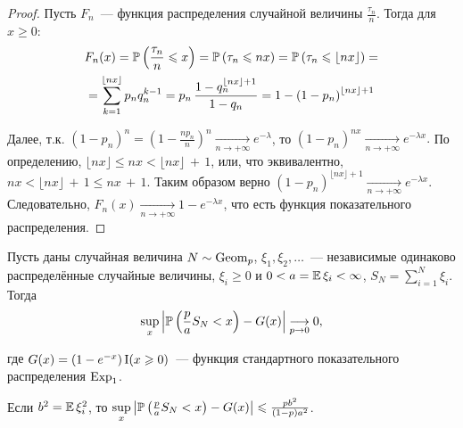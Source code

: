 \begin{proof}
    Пусть $F_n$~--- функция распределения случайной величины $\frac{\tau_n}{n}$.
    Тогда для $x \geqslant 0$:
    \begin{multline*}        
        F_{n}(x)=\operatorname{\mathbb{P}}\left(\frac{\tau_{n}}{n} \leqslant x\right)=
        \operatorname{\mathbb{P}}\left(\tau_{n} \leqslant n x\right) = 
        \operatorname{\mathbb{P}}\left(\tau_{n} \leqslant \lfloor n x\rfloor\right) = \\
        = \sum\limits_{k = 1}^{\lfloor nx \rfloor} p_n q_n^{k-1} = 
        p_n \, \frac{1 - q_n^{\lfloor nx \rfloor + 1}} {1-q_n} = 
        1-\left(1-p_{n}\right)^{\lfloor nx \rfloor + 1}
    \end{multline*}
    
    Далее, т.к. $\left(1-p_{n}\right)^{n}=\left(1-\frac{n p_{n}}{n}\right)^{n} \xrightarrow[n \to +\infty]{} e^{-\lambda}$, 
    то $(1 - p_n)^{nx} \xrightarrow[n \to +\infty]{} e^{-\lambda x}.$ 
    По определению, $\lfloor n x\rfloor \leqslant n x<\lfloor n x\rfloor\,+\,1$, 
    или, что эквивалентно, $nx < \lfloor nx \rfloor \,+\,1 \leqslant nx\,+\,1$. 
    Таким образом верно $(1 - p_n)^{\lfloor nx \rfloor + 1} \xrightarrow[n \to +\infty]{} e^{-\lambda x}$. 
    Следовательно, $F_n(x) \xrightarrow[n \to +\infty]{} 1 - e^{-\lambda x}$, что есть функция показательного распределения. 
\end{proof}



\begin{namedthm}
Пусть даны случайная величина $N \sim \operatorname{\mathrm{Geom}}_{p}$, $\xi_1, \xi_2, \ldots$~--- независимые одинаково распределённые случайные величины, 
$\xi_i \geqslant 0$ и $0 < a = \operatorname{\mathbb{E}} \xi_i < \infty$, $S_N = \sum\limits_{i=1}^N \xi_i$. Тогда
\begin{equation*}
    \sup\limits_{x}\left|\operatorname{\mathbb{P}}\left(\frac{p}{a} S_{N}<x\right)-G(x)\right| \underset{p \to 0}{\longrightarrow} 0,
\end{equation*}

где $G(x)=\left(1-e^{-x}\right) \operatorname{\mathrm{I}}(x \geqslant 0)$~--- функция стандартного показательного распределения $\operatorname{\mathrm{Exp}}_{1}$.

Если $b^2 = \operatorname{\mathbb{E}} \xi_i^2$, то $\sup\limits_{x}\left|\operatorname{\mathbb{P}}\left(\frac{p}{a} S_{N}<x\right)-G(x)\right| \leqslant \frac{p b^{2}}{(1-p) a^{2}}$.
\end{namedthm}

